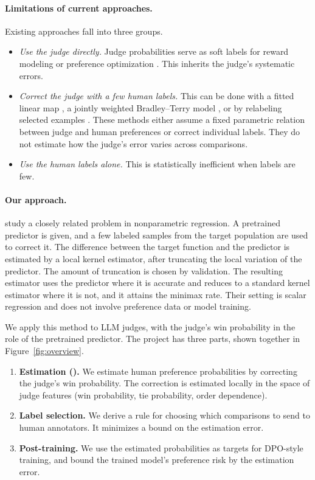 \paragraph{Limitations of current approaches.}
Existing approaches fall into three groups.
\begin{itemize}
  \item \emph{Use the judge directly.} Judge probabilities serve as soft labels for reward modeling
        or preference optimization \citep{lee2024rlaif,furuta2024gapo}. This inherits the judge's
        systematic errors.
  \item \emph{Correct the judge with a few human labels.} This can be done with a fitted linear map
        \citep{vandenburg2025aligning}, a jointly weighted Bradley--Terry model \citep{cai2026dial},
        or by relabeling selected examples \citep{xu2025rlthf}. These methods either assume a fixed
        parametric relation between judge and human preferences or correct individual labels. They
        do not estimate how the judge's error varies across comparisons.
  \item \emph{Use the human labels alone.} This is statistically inefficient when labels are few.
\end{itemize}

\paragraph{Our approach.}
\citet{li2026personalizing} study a closely related problem in nonparametric regression. A
pretrained predictor is given, and a few labeled samples from the target population are used to
correct it. The difference between the target function and the predictor is estimated by a local
kernel estimator, after truncating the local variation of the predictor. The amount of truncation
is chosen by validation. The resulting estimator uses the predictor where it is accurate and
reduces to a standard kernel estimator where it is not, and it attains the minimax rate. Their
setting is scalar regression and does not involve preference data or model training.

We apply this method to LLM judges, with the judge's win probability in the role of the pretrained
predictor. The project has three parts, shown together in Figure~\ref{fig:overview}.
\begin{enumerate}
  \item \textbf{Estimation (\dfsp).} We estimate human preference probabilities by correcting the
        judge's win probability. The correction is estimated locally in the space of judge
        features (win probability, tie probability, order dependence).
  \item \textbf{Label selection.} We derive a rule for choosing which comparisons to send to human
        annotators. It minimizes a bound on the estimation error.
  \item \textbf{Post-training.} We use the estimated probabilities as targets for DPO-style
        training, and bound the trained model's preference risk by the estimation error.
\end{enumerate}


